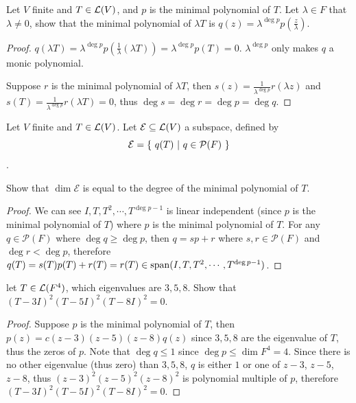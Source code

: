\documentclass[../main.tex]{subfiles}
\begin{document}
\begin{exercise}
  Let $V$ finite and $T \in \mathcal{L}(V)$, and $p$ is the minimal polynomial of $T$.
  Let $\lambda \in F$ that $\lambda \neq 0$, show that
  the minimal polynomial of $\lambda T$ is $q(z) = \lambda^{\deg p} p(\frac{z}{\lambda})$.
\end{exercise}
\begin{proof}
  $q(\lambda T) = \lambda^{\deg p}p(\frac{1}{\lambda}(\lambda T)) = \lambda^{\deg p} p(T) = 0$.
  $\lambda^{\deg p}$ only makes $q$ a monic polynomial.

  Suppose $r$ is the minimal polynomial of $\lambda T$, then $s(z) = \frac{1}{\lambda^{\deg p}}r(\lambda z)$
  and $s(T) = \frac{1}{\lambda^{\deg p}}r(\lambda T) = 0$, thus $\deg s = \deg r = \deg p = \deg q$.
\end{proof}

\begin{exercise}
  Let $V$ finite and $T \in \mathcal{L}(V)$. Let $\mathcal{E} \subseteq \mathcal{L}(V)$ a subspace,
  defined by
  \[
  \mathcal{E} = \{ \ q(T) \ | \ q \in \mathcal{P}(F) \ \}
  \].

  Show that $\dim \mathcal{E}$ is equal to the degree of the minimal polynomial of $T$.
\end{exercise}
\begin{proof}
  We can see $I, T, T^2, \cdots, T^{\deg p - 1}$ is linear independent (since $p$ is the minimal polynomial of $T$) where $p$ is
  the minimal polynomial of $T$. For any $q \in \mathcal{P}(F)$
  where $\deg q \ge \deg p$, then $q = sp + r$ where $s, r \in \mathcal{P}(F)$
  and $\deg r < \deg p$, therefore $q(T) = s(T)p(T) + r(T) = r(T) \in \operatorname{span}(I, T, T^2, \cdots, T^{\deg p - 1})$.
\end{proof}

\begin{exercise}
  let $T \in \mathcal{L}(F^4)$, which eigenvalues are $3, 5, 8$. Show that $(T - 3I)^2(T - 5I)^2(T - 8I)^2 = 0$.
\end{exercise}
\begin{proof}
  Suppose $p$ is the minimal polynomial of $T$, then $p(z) = c(z - 3)(z - 5)(z - 8)q(z)$
  since $3, 5, 8$ are the eigenvalue of $T$, thus the zeros of $p$.
  Note that $\deg q \le 1$ since $\deg p \le \dim F^4 = 4$.
  Since there is no other eigenvalue (thus zero) than $3, 5, 8$, $q$ is either $1$
  or one of $z - 3$, $z - 5$, $z - 8$, thus $(z - 3)^2(z - 5)^2(z - 8)^2$ is 
  polynomial multiple of $p$, therefore $(T - 3I)^2(T - 5I)^2(T - 8I)^2 = 0$.
\end{proof}
\end{document}
